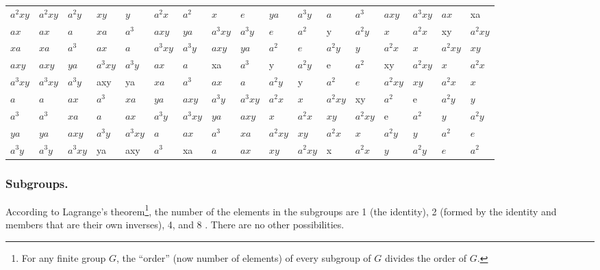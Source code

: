 {\begin{landscape}
\begin{table}[h]
\begin{tabular}{l|llllllllllllllll}
      $a^{2}xy$&\cellcolor{blue!25} $a^{2}xy$&\cellcolor{blue!25} $a^{2}y$       &\cellcolor{blue!25} $xy$ &\cellcolor{blue!25} $y$ &\cellcolor{blue!25} $a^{2}x$ &\cellcolor{blue!25} $a^{2}$ &\cellcolor{blue!25} $x$ &\cellcolor{blue!25} $e$ & $ya$ & $a^{3}y$ & $a$ & $a^{3}$ & $axy$ & $a^{3}xy$ & $ax$ & xa \\
      $ax$       & $ax$       & $a$        & $xa$ & $a^{3}$ & $axy$ & $ya$ & $a^{3}xy$ & $a^{3}y$ & $e$ & $a^{2}$ & y & $a^{2}y$ & $x$ & $a^{2}x$ & xy & $a^{2}xy$ \\
      $xa$       & $xa$       & $a^{3}$        & $ax$ & $a$ & $a^{3}xy$ & $a^{3}y$ & $axy$ & $ya$ & $a^{2}$ & $e$ & $a^{2}y$ & $y$ & $a^{2}x$ & $x$ & $a^{2}xy$ & $xy$ \\
      $axy$      & $axy$      & $ya$        & $a^{3}xy$ & $a^{3}y$ & $ax$ & $a$ & xa & $a^{3}$ & y & $a^{2}y$ & e & $a^{2}$ & xy & $a^{2}xy$ & $x$ & $a^{2}x$ \\
      $a^{3}xy$& $a^{3}xy$& $a^{3}y$        & axy & ya & $xa$ & $a^{3}$ & $ax$ & $a$ & $a^{2}y$ & y & $a^{2}$ & $e$ & $a^{2}xy$ & $xy$ & $a^{2}x$ & $x$ \\
      $a$        & $a$        & $ax$        & $a^{3}$ & $xa$ & $ya$ & $axy$ & $a^{3}y$ & $a^{3}xy$ & $a^{2}x$ & $x$ & $a^{2}xy$ & xy & $a^{2}$ & e & $a^{2}y$ & $y$ \\
      $a^{3}$  & $a^{3}$  & $xa$        & $a$ & $ax$ & $a^{3}y$ & $a^{3}xy$ & $ya$ & $axy$ & $x$ & $a^{2}x$ & $xy$ & $a^{2}xy$ & e & $a^{2}$ & $y$ & $a^{2}y$ \\
      $ya$       & $ya$       & $axy$ & $a^{3}y$ & $a^{3}xy$ & $a$ & $ax$ & $a^{3}$ & $xa$ & $a^{2}xy$ & $xy$ & $a^{2}x$ & $x$ & $a^{2}y$ & $y$ & $a^{2}$ & $e$ \\
      $a^{3}y$ &$a^{3}y$  & $a^{3}xy$ & ya & axy & $a^{3}$ & xa & $a$ & $ax$ & $xy$ & $a^{2}xy$ & x & $a^{2}x$ & $y$ & $a^{2}y$ & $e$ & $a^{2}$\\
    \end{tabular}
  \end{table}
\end{landscape}


\subsubsection{Subgroups.}
%
According to  Lagrange's theorem\footnote{For any finite group $G$, the ``order'' (now number of elements) of every subgroup of $G$ divides the order of $G$.},  the number of the elements in the subgroups are 1 (the identity), 2 (formed by the identity and members that are their own inverses), 4, and 8 \cite{Zee2016}. There are no other possibilities.

}
